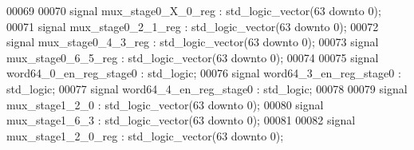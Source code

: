 \begin{DoxyCode}
00069 
00070 \textcolor{keywordflow}{signal} \textcolor{vhdlchar}{mux_stage0_X_0_reg}       \textcolor{vhdlchar}{:} \textcolor{comment}{std\_logic\_vector}\textcolor{vhdlchar}{(}\textcolor{vhdllogic}{}\textcolor{vhdllogic}{63} \textcolor{keywordflow}{downto} \textcolor{vhdllogic}{}\textcolor{vhdllogic}{0}\textcolor{vhdlchar}{)};
00071 \textcolor{keywordflow}{signal} \textcolor{vhdlchar}{mux_stage0_2_1_reg}       \textcolor{vhdlchar}{:} \textcolor{comment}{std\_logic\_vector}\textcolor{vhdlchar}{(}\textcolor{vhdllogic}{}\textcolor{vhdllogic}{63} \textcolor{keywordflow}{downto} \textcolor{vhdllogic}{}\textcolor{vhdllogic}{0}\textcolor{vhdlchar}{)};
00072 \textcolor{keywordflow}{signal} \textcolor{vhdlchar}{mux_stage0_4_3_reg}       \textcolor{vhdlchar}{:} \textcolor{comment}{std\_logic\_vector}\textcolor{vhdlchar}{(}\textcolor{vhdllogic}{}\textcolor{vhdllogic}{63} \textcolor{keywordflow}{downto} \textcolor{vhdllogic}{}\textcolor{vhdllogic}{0}\textcolor{vhdlchar}{)};
00073 \textcolor{keywordflow}{signal} \textcolor{vhdlchar}{mux_stage0_6_5_reg}       \textcolor{vhdlchar}{:} \textcolor{comment}{std\_logic\_vector}\textcolor{vhdlchar}{(}\textcolor{vhdllogic}{}\textcolor{vhdllogic}{63} \textcolor{keywordflow}{downto} \textcolor{vhdllogic}{}\textcolor{vhdllogic}{0}\textcolor{vhdlchar}{)};
00074 
00075 \textcolor{keywordflow}{signal} \textcolor{vhdlchar}{word64_0_en_reg_stage0} \textcolor{vhdlchar}{:} \textcolor{comment}{std\_logic};
00076 \textcolor{keywordflow}{signal} \textcolor{vhdlchar}{word64_3_en_reg_stage0} \textcolor{vhdlchar}{:} \textcolor{comment}{std\_logic};
00077 \textcolor{keywordflow}{signal} \textcolor{vhdlchar}{word64_4_en_reg_stage0} \textcolor{vhdlchar}{:} \textcolor{comment}{std\_logic};
00078 
00079 \textcolor{keywordflow}{signal} \textcolor{vhdlchar}{mux_stage1_2_0}           \textcolor{vhdlchar}{:} \textcolor{comment}{std\_logic\_vector}\textcolor{vhdlchar}{(}\textcolor{vhdllogic}{}\textcolor{vhdllogic}{63} \textcolor{keywordflow}{downto} \textcolor{vhdllogic}{}\textcolor{vhdllogic}{0}\textcolor{vhdlchar}{)};
00080 \textcolor{keywordflow}{signal} \textcolor{vhdlchar}{mux_stage1_6_3}           \textcolor{vhdlchar}{:} \textcolor{comment}{std\_logic\_vector}\textcolor{vhdlchar}{(}\textcolor{vhdllogic}{}\textcolor{vhdllogic}{63} \textcolor{keywordflow}{downto} \textcolor{vhdllogic}{}\textcolor{vhdllogic}{0}\textcolor{vhdlchar}{)};
00081 
00082 \textcolor{keywordflow}{signal} \textcolor{vhdlchar}{mux_stage1_2_0_reg}       \textcolor{vhdlchar}{:} \textcolor{comment}{std\_logic\_vector}\textcolor{vhdlchar}{(}\textcolor{vhdllogic}{}\textcolor{vhdllogic}{63} \textcolor{keywordflow}{downto} \textcolor{vhdllogic}{}\textcolor{vhdllogic}{0}\textcolor{vhdlchar}{)};

\end{DoxyCode}
